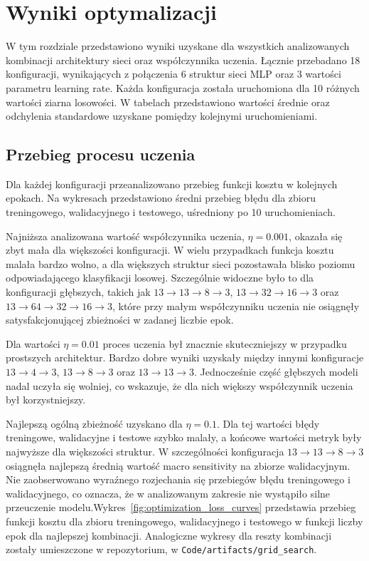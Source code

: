 \section{Wyniki optymalizacji}

W tym rozdziale przedstawiono wyniki uzyskane dla wszystkich analizowanych
kombinacji architektury sieci oraz współczynnika uczenia. Łącznie przebadano
18 konfiguracji, wynikających z połączenia 6 struktur sieci MLP oraz 3 wartości
parametru learning rate. Każda konfiguracja została uruchomiona dla 10 różnych
wartości ziarna losowości. W tabelach przedstawiono wartości średnie oraz
odchylenia standardowe uzyskane pomiędzy kolejnymi uruchomieniami.

\subsection{Przebieg procesu uczenia}

Dla każdej konfiguracji przeanalizowano przebieg funkcji kosztu w kolejnych
epokach. Na wykresach przedstawiono średni przebieg błędu dla zbioru
treningowego, walidacyjnego i testowego, uśredniony po 10 uruchomieniach.

Najniższa analizowana wartość współczynnika uczenia, \(\eta = 0.001\), okazała się
zbyt mała dla większości konfiguracji. W wielu przypadkach funkcja kosztu
malała bardzo wolno, a dla większych struktur sieci pozostawała blisko poziomu
odpowiadającego klasyfikacji losowej. Szczególnie widoczne było to dla
konfiguracji głębszych, takich jak
\(13 \rightarrow 13 \rightarrow 8 \rightarrow 3\),
\(13 \rightarrow 32 \rightarrow 16 \rightarrow 3\) oraz
\(13 \rightarrow 64 \rightarrow 32 \rightarrow 16 \rightarrow 3\), które przy
małym współczynniku uczenia nie osiągnęły satysfakcjonującej zbieżności w
zadanej liczbie epok.

Dla wartości \(\eta = 0.01\) proces uczenia był znacznie skuteczniejszy w przypadku
prostszych architektur. Bardzo dobre wyniki uzyskały między innymi konfiguracje
\(13 \rightarrow 4 \rightarrow 3\), \(13 \rightarrow 8 \rightarrow 3\) oraz
\(13 \rightarrow 13 \rightarrow 3\). Jednocześnie część głębszych modeli nadal
uczyła się wolniej, co wskazuje, że dla nich większy współczynnik uczenia był
korzystniejszy.

Najlepszą ogólną zbieżność uzyskano dla \(\eta = 0.1\). Dla tej wartości błędy
treningowe, walidacyjne i testowe szybko malały, a końcowe wartości metryk były
najwyższe dla większości struktur. W szczególności konfiguracja
\(13 \rightarrow 13 \rightarrow 8 \rightarrow 3\) osiągnęła najlepszą średnią
wartość macro sensitivity na zbiorze walidacyjnym. Nie zaobserwowano wyraźnego
rozjechania się przebiegów błędu treningowego i walidacyjnego, co oznacza, że w
analizowanym zakresie nie wystąpiło silne przeuczenie modelu.Wykres~\ref{fig:optimization_loss_curves} 
przedstawia przebieg funkcji kosztu dla zbioru treningowego, walidacyjnego
i testowego w funkcji liczby epok dla najlepszej kombinacji. Analogiczne wykresy
dla reszty kombinacji zostały umieszczone w repozytorium, w \texttt{Code/artifacts/grid\_search}.

